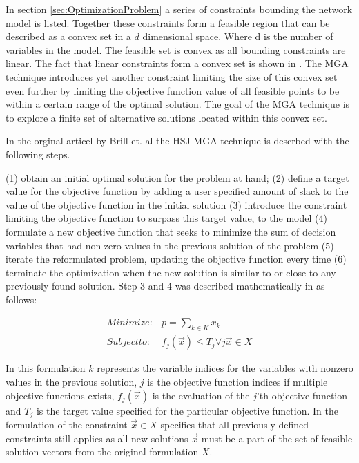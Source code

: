 In section \ref{sec:OptimizationProblem} a series of constraints bounding the network model is listed. Together these constraints form a feasible region that can be described as a convex set in a $d$ dimensional space. Where d is the number of variables in the model. The feasible set is convex as all bounding constraints are linear. The fact that linear constraints form a convex set is shown in \cite{ConvexOpimization}. The MGA technique introduces yet another constraint limiting the size of this convex set even further by limiting the objective function value of all feasible points to be within a certain range of the optimal solution. The goal of the MGA technique is to explore a finite set of alternative solutions located within this convex set. 

In the orginal articel by Brill et. al \cite{Brill_MGA_1982} the HSJ MGA technique is descrbed with the following steps. 

(1) obtain an initial optimal solution for the problem at hand; (2) define a target value for the objective function by adding a user specified amount of slack to the value of the objective function in the initial solution (3) introduce the constraint limiting the objective function to surpass this target value, to the model (4) formulate a new objective function that seeks to minimize the sum of decision variables that had non zero values in the previous solution of the problem (5) iterate the reformulated problem, updating the objective function every time (6) terminate the optimization when the new solution is similar to or close to any previously found solution. Step 3 and 4 was described mathematically in \cite{Brill_MGA_1982} as follows:

\begin{equation}
\begin{split}
Minimize :&  p = \sum_{k \in K} x_k \\
Subject to :&  f_j(\vec{x}) \leq T_j \forall j  \vec{x}\in X
\end{split}
\end{equation}

In this formulation $k$ represents the variable indices for the variables with nonzero values in the previous solution, $j$ is the objective function indices if multiple objective functions exists, $f_j(\vec{x})$ is the evaluation of the $j$'th objective function and $T_j$ is the target value specified for the particular objective function. In the formulation of the constraint $\vec{x}\in X$ specifies that all previously defined constraints still applies as all new solutions $\vec{x}$ must be a part of the set of feasible solution vectors from the original formulation $X$.

